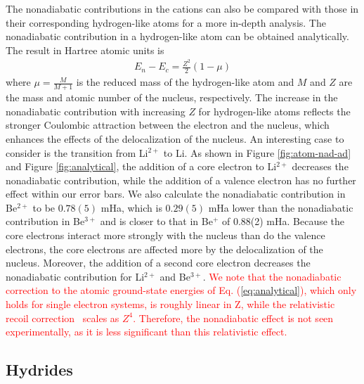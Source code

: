 \documentclass[aip,jcp,numerical,reprint]{revtex4-1}
\begin{document}
The nonadiabatic contributions in the cations can also be compared with those in their corresponding hydrogen-like atoms for a more in-depth analysis. The nonadiabatic contribution in a hydrogen-like atom can be obtained analytically. The result in Hartree atomic units is
\begin{align}
E_n-E_c=\frac{Z^2}{2}(1-\mu) \label{eq:analytical}
\end{align}
where $\mu=\frac{M}{M+1}$ is the reduced mass of the hydrogen-like atom and $M$ and $Z$ are the mass and atomic number of the nucleus, respectively. The increase in the nonadiabatic contribution with increasing $Z$ for hydrogen-like atoms reflects the stronger Coulombic attraction between the electron and the nucleus, which enhances the effects of the delocalization of the nucleus. An interesting case to consider is the transition from Li$^{2+}$ to Li. As shown in Figure \ref{fig:atom-nad-ad} and Figure \ref{fig:analytical}, the addition of a core electron to Li$^{2+}$ decreases the nonadiabatic contribution, while the addition of a valence electron has no further effect within our error bars. We also calculate the nonadiabatic contribution in Be$^{2+}$ to be $0.78(5)$ mHa, which is $0.29(5)$ mHa lower than the nonadiabatic contribution in Be$^{3+}$ and is closer to that in Be$^{+}$ of 0.88(2) mHa. Because the core electrons interact more strongly with the nucleus than do the valence electrons, the core electrons are affected more by the delocalization of the nucleus. Moreover, the addition of a second core electron decreases the nonadiabatic contribution for Li$^{2+}$ and Be$^{3+}$. %
\textcolor{red}{We note that the nonadiabatic correction to the atomic ground-state energies of Eq. (\ref{eq:analytical}), which only holds for single electron systems, is roughly linear in Z, while the relativistic recoil correction~\cite{Merkt_H2} scales as $Z^4$. Therefore, the nonadiabatic effect is not seen experimentally,  as it is less significant than this relativistic effect.}

\subsection{Hydrides}
\end{document}
